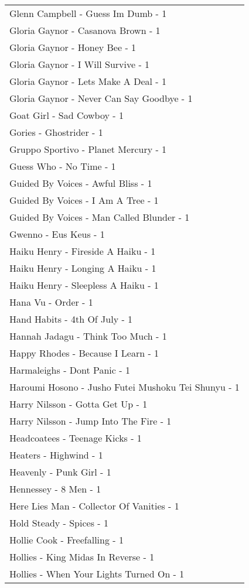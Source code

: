 \documentclass[
]{article}
\begin{document}
\begin{longtable}{l}
Glenn Campbell - Guess Im Dumb - 1 \\ 
Gloria Gaynor - Casanova Brown - 1 \\ 
Gloria Gaynor - Honey Bee - 1 \\ 
Gloria Gaynor - I Will Survive - 1 \\ 
Gloria Gaynor - Lets Make A Deal - 1 \\ 
Gloria Gaynor - Never Can Say Goodbye - 1 \\ 
Goat Girl - Sad Cowboy - 1 \\ 
Gories - Ghostrider - 1 \\ 
Gruppo Sportivo - Planet Mercury - 1 \\ 
Guess Who - No Time - 1 \\ 
Guided By Voices - Awful Bliss - 1 \\ 
Guided By Voices - I Am A Tree - 1 \\ 
Guided By Voices - Man Called Blunder - 1 \\ 
Gwenno - Eus Keus - 1 \\ 
Haiku Henry - Fireside A Haiku - 1 \\ 
Haiku Henry - Longing A Haiku - 1 \\ 
Haiku Henry - Sleepless A Haiku - 1 \\ 
Hana Vu - Order - 1 \\ 
Hand Habits - 4th Of July - 1 \\ 
Hannah Jadagu - Think Too Much - 1 \\ 
Happy Rhodes - Because I Learn - 1 \\ 
Harmaleighs - Dont Panic - 1 \\ 
Haroumi Hosono - Jusho Futei Mushoku Tei Shunyu - 1 \\ 
Harry Nilsson - Gotta Get Up - 1 \\ 
Harry Nilsson - Jump Into The Fire - 1 \\ 
Headcoatees - Teenage Kicks - 1 \\ 
Heaters - Highwind - 1 \\ 
Heavenly - Punk Girl - 1 \\ 
Hennessey - 8 Men - 1 \\ 
Here Lies Man - Collector Of Vanities - 1 \\ 
Hold Steady - Spices - 1 \\ 
Hollie Cook - Freefalling - 1 \\ 
Hollies - King Midas In Reverse - 1 \\ 
Hollies - When Your Lights Turned On - 1 \\ 

\end{longtable}
\end{document}
